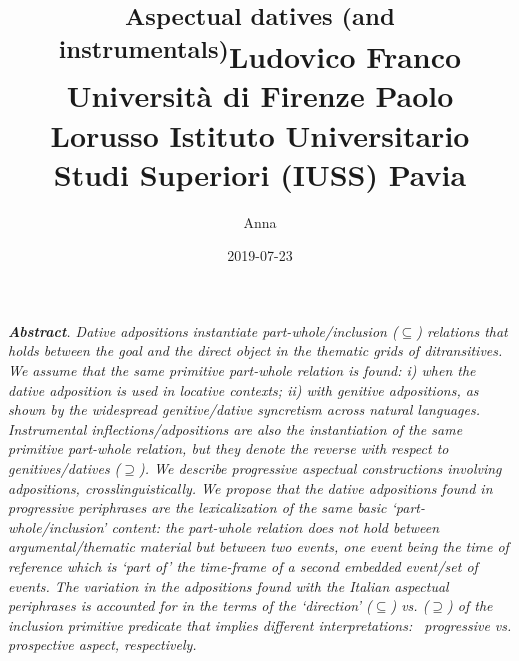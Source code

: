 \documentclass[12pt]{article}
\title{}
\author{Anna}
\date{2019-07-23}
\newenvironment{styleStandard}{\setlength\leftskip{0cm}\setlength\rightskip{0cm plus 1fil}\setlength\parindent{0cm}\setlength\parfillskip{0pt plus 1fil}\setlength\parskip{0in plus 1pt}\writerlistparindent\writerlistleftskip\leavevmode\normalfont\normalsize\writerlistlabel\ignorespaces}{\unskip\vspace{0.111in plus 0.0111in}\par}
\newcommand\writerlistleftskip{}
\newcommand\writerlistparindent{}
\newcommand\writerlistlabel{}
\begin{document}
\title{\textsuperscript{Aspectual datives (and instrumentals)}}
\maketitle

\title{Ludovico Franco }
\maketitle

\title{Università di Firenze }
\maketitle

\title{Paolo Lorusso }
\maketitle

\title{Istituto Universitario Studi Superiori (IUSS) Pavia }
\maketitle

\begin{styleStandard}
\textbf{\textit{Abstract}}\textit{. Dative adpositions}\textbf{\textit{ }}\textit{instantiate part-whole/inclusion (${\subseteq}$) relations that holds between the goal and the direct object in the thematic grids of ditransitives. We assume that the same primitive part-whole relation is found: i) when the dative adposition is used in locative contexts; ii) with genitive adpositions, as shown by the widespread genitive/dative syncretism across natural languages. Instrumental inflections/adpositions are also the instantiation of the same primitive part-whole relation, but they denote the reverse with respect to genitives/datives (${\supseteq}$). We describe progressive aspectual constructions involving adpositions, crosslinguistically. We propose that the dative adpositions found in progressive periphrases are the lexicalization of the same basic ‘part-whole/inclusion’ content: the part-whole relation does not hold between argumental/thematic material but between two events, one event being the time of reference which is ‘part of’ the time-frame of a second embedded event/set of events. The variation in the adpositions found with the Italian aspectual periphrases is accounted for in the terms of the ‘direction’ (${\subseteq}$) vs. (${\supseteq}$) of the inclusion primitive predicate that implies different interpretations: \ progressive vs. prospective aspect, respectively. }
\end{styleStandard}
\end{document}
